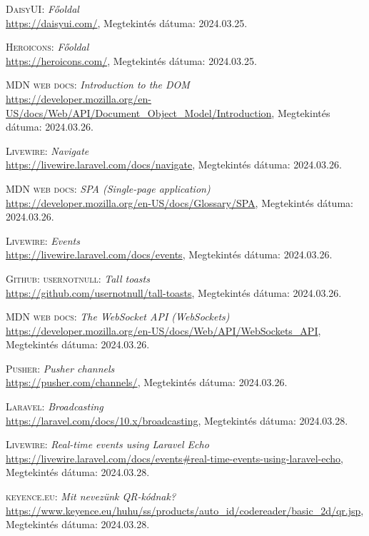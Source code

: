\documentclass[
]{thesis-ekf}
\theoremstyle{definition}
\theoremstyle{remark}
\begin{document}
\begin{thebibliography}{19}
\textsc{DaisyUI}: \emph{Főoldal}
\\
\url{https://daisyui.com/}, Megtekintés dátuma: 2024.03.25.

\textsc{Heroicons}: \emph{Főoldal}
\\
\url{https://heroicons.com/}, Megtekintés dátuma: 2024.03.25.

\textsc{MDN web docs}: \emph{Introduction to the DOM}
\\
\url{https://developer.mozilla.org/en-US/docs/Web/API/Document_Object_Model/Introduction}, Megtekintés dátuma: 2024.03.26.

\textsc{Livewire}: \emph{Navigate}
\\
\url{https://livewire.laravel.com/docs/navigate}, Megtekintés dátuma: 2024.03.26.

\textsc{MDN web docs}: \emph{SPA (Single-page application)}
\\
\url{https://developer.mozilla.org/en-US/docs/Glossary/SPA}, Megtekintés dátuma: 2024.03.26.

\textsc{Livewire}: \emph{Events}
\\
\url{https://livewire.laravel.com/docs/events}, Megtekintés dátuma: 2024.03.26.

\textsc{Github: usernotnull}: \emph{Tall toasts}
\\
\url{https://github.com/usernotnull/tall-toasts}, Megtekintés dátuma: 2024.03.26.

\textsc{MDN web docs}: \emph{The WebSocket API (WebSockets)}
\\
\url{https://developer.mozilla.org/en-US/docs/Web/API/WebSockets_API}, Megtekintés dátuma: 2024.03.26.

\textsc{Pusher}: \emph{Pusher channels}
\\
\url{https://pusher.com/channels/}, Megtekintés dátuma: 2024.03.26.

\textsc{Laravel}: \emph{Broadcasting}
\\
\url{https://laravel.com/docs/10.x/broadcasting}, Megtekintés dátuma: 2024.03.28.

\textsc{Livewire}: \emph{Real-time events using Laravel Echo}
\\
\url{https://livewire.laravel.com/docs/events#real-time-events-using-laravel-echo}, Megtekintés dátuma: 2024.03.28.

\textsc{keyence.eu}: \emph{Mit nevezünk QR-kódnak?}
\\
\url{https://www.keyence.eu/huhu/ss/products/auto_id/codereader/basic_2d/qr.jsp}, Megtekintés dátuma: 2024.03.28.


\end{thebibliography}
\end{document}
